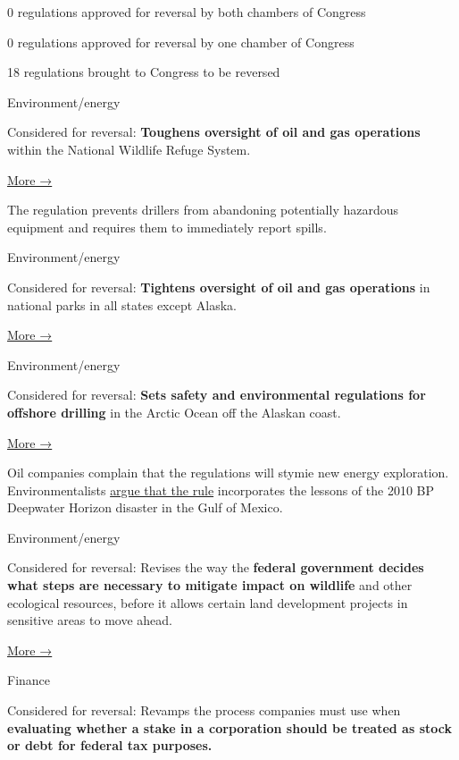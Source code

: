 0 regulations approved for reversal by both chambers of Congress

0 regulations approved for reversal by one chamber of Congress

18 regulations brought to Congress to be reversed

Environment/energy

Considered for reversal: \textbf{Toughens oversight of oil and gas
operations} within the National Wildlife Refuge System.

\href{https://www.fws.gov/news/ShowNews.cfm?ref=service-finalizes-improvements-to-50-year-old-regulations-governing-oil-\&_ID=35889}{More
→}

The regulation prevents drillers from abandoning potentially hazardous
equipment and requires them to immediately report spills.

Environment/energy

Considered for reversal: \textbf{Tightens oversight of oil and gas
operations} in national parks in all states except Alaska.

\href{https://www.federalregister.gov/documents/2016/11/04/2016-26489/general-provisions-and-non-federal-oil-and-gas-rights}{More
→}

Environment/energy

Considered for reversal: \textbf{Sets safety and environmental
regulations for offshore drilling} in the Arctic Ocean off the Alaskan
coast.

\href{https://www.nytimes3xbfgragh.onion/2016/07/08/us/politics/latest-of-obamas-safety-rules-on-arctic-drilling-are-released.html}{More
→}

Oil companies complain that the regulations will stymie new energy
exploration. Environmentalists
\href{http://rulesatrisk.org/arctic-drilling-safeguards/}{argue that the
rule} incorporates the lessons of the 2010 BP Deepwater Horizon disaster
in the Gulf of Mexico.

Environment/energy

Considered for reversal: Revises the way the \textbf{federal government
decides what steps are necessary to mitigate impact on wildlife} and
other ecological resources, before it allows certain land development
projects in sensitive areas to move ahead.

\href{https://www.federalregister.gov/documents/2016/11/21/2016-27751/us-fish-and-wildlife-service-mitigation-policy}{More
→}

Finance

Considered for reversal: Revamps the process companies must use when
\textbf{evaluating whether a stake in a corporation should be treated as
stock or debt for federal tax purposes.}


